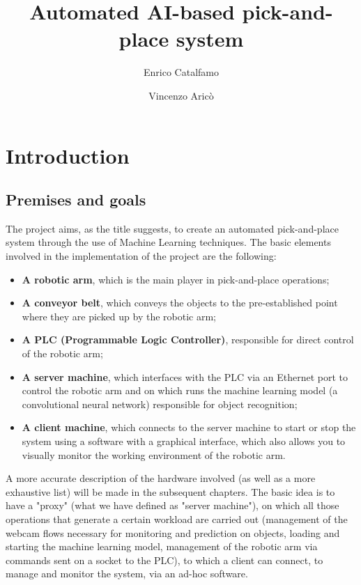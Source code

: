 \documentclass[a4paper,11pt]{report}
\author{Enrico Catalfamo \and Vincenzo Aricò}
\title{Automated AI-based pick-and-place system}
\theoremstyle{definition}
\theoremstyle{plain}
\begin{document}
\maketitle

\tableofcontents

\chapter{Introduction}
    \section{Premises and goals}
        The project aims, as the title suggests, to create an automated pick-and-place system through the use of Machine Learning techniques. The basic elements involved in the implementation of the project are the following:
        \begin{itemize}
            \item \textbf{A robotic arm}, which is the main player in pick-and-place operations;
            \item \textbf{A conveyor belt}, which conveys the objects to the pre-established point where they are picked up by the robotic arm;
            \item \textbf{A PLC (Programmable Logic Controller)}, responsible for direct control of the robotic arm;
            \item \textbf{A server machine}, which interfaces with the PLC via an Ethernet port to control the robotic arm and on which runs the machine learning model (a convolutional neural network) responsible for object recognition;
            \item \textbf{A client machine}, which connects to the server machine to start or stop the system using a software with a graphical interface, which also allows you to visually monitor the working environment of the robotic arm.
        \end{itemize}
        A more accurate description of the hardware involved (as well as a more exhaustive list) will be made in the subsequent chapters. The basic idea is to have a "proxy" (what we have defined as "server machine"), on which all those operations that generate a certain workload are carried out (management of the webcam flows necessary for monitoring and prediction on objects, loading and starting the machine learning model, management of the robotic arm via commands sent on a socket to the PLC), to which a client can connect, to manage and monitor the system, via an ad-hoc software.
        
\end{document}
